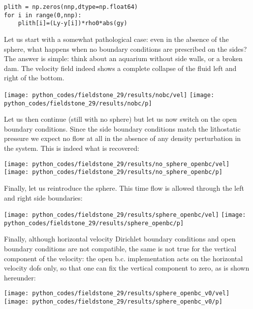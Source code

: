 \begin{lstlisting}
plith = np.zeros(nnp,dtype=np.float64)
for i in range(0,nnp):
    plith[i]=(Ly-y[i])*rho0*abs(gy)
\end{lstlisting}


Let us start with a somewhat pathological case: even in the absence of the 
sphere, what happens when no 
boundary conditions are prescribed on the sides? The answer is simple: 
think about an aquarium without side walls, or a broken dam. The velocity field 
indeed shows a complete collapse of the fluid left and right of the bottom.

\begin{center}
\texttt{[image: python\_codes/fieldstone\_29/results/nobc/vel]}
\texttt{[image: python\_codes/fieldstone\_29/results/nobc/p]}
\end{center}

Let us then continue (still with no sphere) but let us now switch on the open 
boundary conditions. Since the side boundary conditions match the lithostatic 
pressure we expect no flow at all in the absence of any density perturbation
in the system. This is indeed what is recovered:

\begin{center}
\texttt{[image: python\_codes/fieldstone\_29/results/no\_sphere\_openbc/vel]}
\texttt{[image: python\_codes/fieldstone\_29/results/no\_sphere\_openbc/p]}
\end{center}
 
Finally, let us reintroduce the sphere. This 
time flow is allowed through the left and right side boundaries:

\begin{center}
\texttt{[image: python\_codes/fieldstone\_29/results/sphere\_openbc/vel]}
\texttt{[image: python\_codes/fieldstone\_29/results/sphere\_openbc/p]}
\end{center}

Finally, although horizontal velocity Dirichlet boundary conditions and open 
boundary conditions are not compatible, the same is not true for the vertical component 
of the velocity: the open b.c. implementation acts on the horizontal velocity 
dofs only, so that one can fix the vertical component to zero, as is shown hereunder:

\begin{center}
\texttt{[image: python\_codes/fieldstone\_29/results/sphere\_openbc\_v0/vel]}
\texttt{[image: python\_codes/fieldstone\_29/results/sphere\_openbc\_v0/p]}
\end{center}

